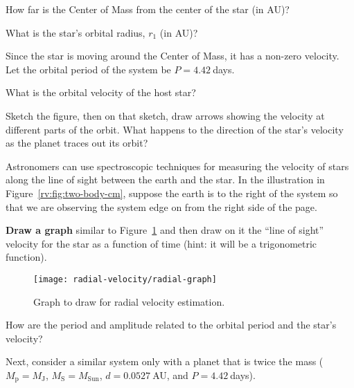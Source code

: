 \begin{steps}
	\item How far is the Center of Mass from the center of the star (in AU)?
	
	\item What is the star’s orbital radius, $r_1$ (in AU)?
\end{steps}

Since the star is moving around the Center of Mass, it has a non-zero velocity. Let the orbital period of the system be $P = 4.42\:$days.

\begin{steps}
	\item What is the orbital velocity of the host star?
	
	\item Sketch the figure, then on that sketch, draw arrows showing the velocity at different parts of the orbit. What happens to the direction of the star’s velocity as the planet traces out its orbit?
\end{steps}

Astronomers can use spectroscopic techniques for measuring the velocity of stars along the line of sight between the earth and the star. In the illustration in Figure~\ref{rv:fig:two-body-cm}, suppose the earth is to the right of the system so that we are observing the system edge on from the right side of the page. 

\begin{steps}
	\item \textbf{Draw a graph} similar to Figure~\ref{rv:fig:graph} and then draw on it the ``line of sight'' velocity for the star as a function of time (hint: it will be a trigonometric function).
\end{steps}

\begin{figure}
	\centering
	\texttt{[image: radial-velocity/radial-graph]}
	\caption{Graph to draw for radial velocity estimation.}\label{rv:fig:graph}
\end{figure}

\begin{steps}
	\item How are the period and amplitude related to the orbital period and the star’s velocity?
\end{steps}

Next, consider a similar system only with a planet that is twice the mass ($M_\textrm{p} = M_\textrm{J}$, $M_\textrm{S} = M_\textrm{Sun}$, $d = 0.0527\:$AU, and $P = 4.42\:$days).



